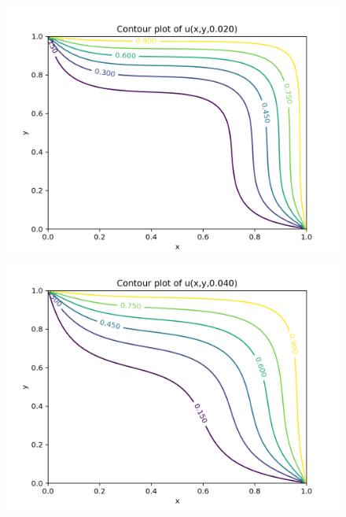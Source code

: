 \documentclass{article}
\begin{document}
\begin{figure}[!tbp]
  \centering
  \begin{minipage}[b]{0.45\textwidth}
    \includegraphics[width=\textwidth]{contour1.png}
  \end{minipage}
  \hfill
  \begin{minipage}[b]{0.45\textwidth}
    \includegraphics[width=\textwidth]{contour2.png}
  \end{minipage}
    \begin{minipage}[b]{0.45\textwidth}

\end{minipage}
\end{figure}
\end{document}
